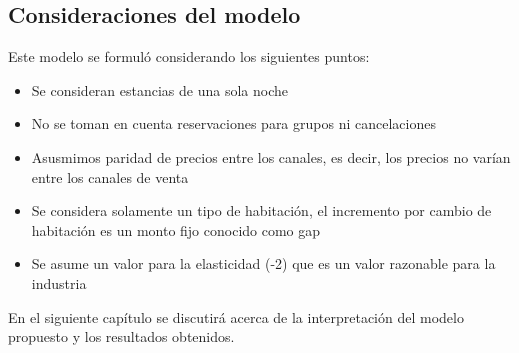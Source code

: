\subsection*{Consideraciones del modelo}

Este modelo se formuló considerando los siguientes puntos:
\begin{itemize}[noitemsep]
  \item Se consideran estancias de una sola noche
  \item No se toman en cuenta reservaciones para grupos ni cancelaciones
  \item Asusmimos paridad de precios entre los canales, es decir, los precios no varían entre los canales de venta
  \item Se considera solamente un tipo de habitación, el incremento por cambio de habitación es un monto fijo conocido como gap
  \item Se asume un valor para la elasticidad (-2) que es un valor razonable para la industria
\end{itemize}

En el siguiente capítulo se discutirá acerca de la interpretación del modelo propuesto y los resultados obtenidos.
